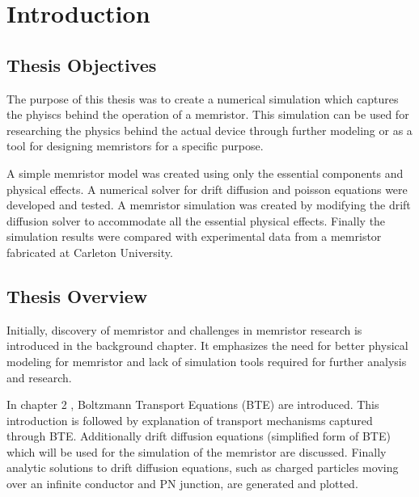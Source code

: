 
\chapter{Introduction} %


\label{Chapter1} %


\section{Thesis Objectives}
\begin{doublespace}
The purpose of this thesis was to create a numerical simulation which captures the phyiscs behind the operation of a memristor. This simulation can be used for researching the physics behind the actual device through further modeling or as a tool for designing memristors for a specific purpose. 

 A simple memristor model was created using only the essential components and physical effects. A numerical solver for drift diffusion and poisson equations were developed and tested. A memristor simulation was created by modifying the drift diffusion solver to accommodate all the essential physical effects. Finally the simulation results were compared with experimental data from a memristor fabricated at Carleton University.

\section{Thesis Overview}

Initially, discovery of memristor and challenges in memristor research is introduced in the background chapter. It emphasizes the need for better physical modeling for memristor and lack of simulation tools required for further analysis and research.

In chapter 2 , Boltzmann Transport Equations (BTE) are introduced. This introduction is followed by explanation of transport mechanisms captured through BTE. Additionally drift diffusion equations (simplified form of BTE) which will be used for the simulation of the memristor are discussed. Finally analytic solutions to drift diffusion equations, such as charged particles moving over an infinite conductor and PN junction, are generated and plotted. 


\end{doublespace}
